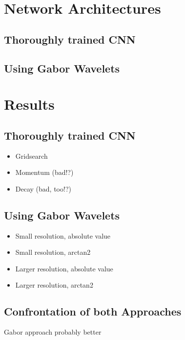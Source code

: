\documentclass[11pt, a4paper]{article}
\begin{document}
\section{Network Architectures}

\subsection{Thoroughly trained CNN}

\subsection{Using Gabor Wavelets}

\newpage

\section{Results}

\subsection{Thoroughly trained CNN}

\begin{itemize}
\item Gridsearch
\item Momentum (bad!?)
\item Decay (bad, too!?)
\end{itemize}

\subsection{Using Gabor Wavelets}

\begin{itemize}
\item Small resolution, absolute value
\item Small resolution, arctan2
\item Larger resolution, absolute value
\item Larger resolution, arctan2
\end{itemize}

\subsection{Confrontation of both Approaches}

Gabor approach probably better

\newpage
\end{document}
